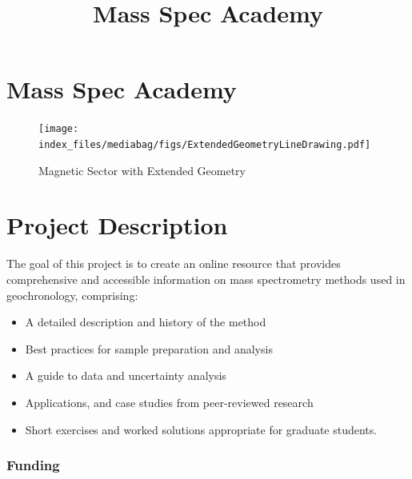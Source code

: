 \documentclass[
  letterpaper,
  DIV=11,
  numbers=noendperiod]{scrreprt}
\title{Mass Spec Academy}
\author{}
\date{}
\providecommand{\tightlist}{%
  \setlength{\itemsep}{0pt}\setlength{\parskip}{0pt}}\usepackage{longtable,booktabs,array}
\renewcommand*\contentsname{Table of contents}
\newcommand\contentsname{Table of contents}
\begin{document}
\maketitle

\renewcommand*\contentsname{Table of contents}
{
\hypersetup{linkcolor=}
\setcounter{tocdepth}{2}
\tableofcontents
}


\chapter{Mass Spec Academy}\label{mass-spec-academy}

\begin{figure}[H]

{\centering \texttt{[image: index\_files/mediabag/figs/ExtendedGeometryLineDrawing.pdf]}

}

\caption{Magnetic Sector with Extended Geometry}

\end{figure}%


\chapter{Project Description}\label{project-description}

The goal of this project is to create an online resource that provides
comprehensive and accessible information on mass spectrometry methods
used in geochronology, comprising:

\begin{itemize}
\tightlist
\item
  A detailed description and history of the method
\item
  Best practices for sample preparation and analysis
\item
  A guide to data and uncertainty analysis
\item
  Applications, and case studies from peer-reviewed research
\item
  Short exercises and worked solutions appropriate for graduate
  students.
\end{itemize}

\subsection{Funding}\label{funding}
\end{document}
